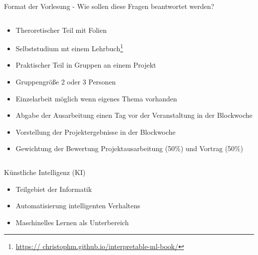\documentclass[aspectratio=1610, xcolor=dvipsnames, 9pt]{beamer}
\begin{document}
\begin{frame}{Format der Vorlesung - Wie sollen diese Fragen beantwortet werden?}
  \begin{columns}
    \begin{column}{0.69\textwidth}
      \begin{itemize}
        \item Theroretischer Teil mit Folien \newline
        \item Selbststudium mt einem Lehrbuch\footnote{\url{https:// christophm.github.io/interpretable-ml-book/}} \newline
        \item Praktischer Teil in Gruppen an einem Projekt  \newline
        \item Gruppengröße 2 oder 3 Personen  \newline
        \item Einzelarbeit möglich wenn eigenes Thema vorhanden \newline
        \item Abgabe der Ausarbeitung einen Tag vor der Veranstaltung in der Blockwoche \newline
        \item Vorstellung der Projektergebnisse in der Blockwoche \newline
        \item Gewichtung der Bewertung Projektausarbeitung (50\%) und Vortrag (50\%)
      \end{itemize}
    \end{column}
  \end{columns}
\end{frame}

\begin{frame}{Künstliche Intelligenz (KI)}
    \begin{itemize}
        \item Teilgebiet der Informatik \newline
        \item Automatisierung intelligenten Verhaltens \newline
        \item Maschinelles Lernen als Unterbereich \newline
    \end{itemize}
\end{frame}
\end{document}
